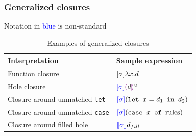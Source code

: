 \documentclass{beamer}
\begin{document}
\begin{frame}
  \frametitle{Generalized closures}

  Notation in \textcolor{blue}{blue} is non-standard
  
  \begin{table}
    \centering
    \begin{tabular}{l|l}
      \hline
      Interpretation & Sample expression \\
      \hline\hline
      Function closure & $[\sigma]\lambda x.d$ \\
      Hole closure & $\textcolor{blue}{[\sigma]}\textcolor{violet}{\llparenthesis} d\textcolor{violet}{\rrparenthesis}^u$ \\
      Closure around unmatched \texttt{let} & $\textcolor{blue}{[\sigma]}(\texttt{let }x=d_1\texttt{ in }d_2)$ \\
      Closure around unmatched \texttt{case} & $\textcolor{blue}{[\sigma]}(\texttt{case }x\texttt{ of }\text{rules})$ \\
      Closure around filled hole & $\textcolor{blue}{\llbracket\sigma\rrbracket} d_{fill}$ \\
      \hline\hline
    \end{tabular}
    \caption{Examples of generalized closures}
    \label{tab:generaized-closures-examples}
  \end{table}

\end{frame}
\end{document}
